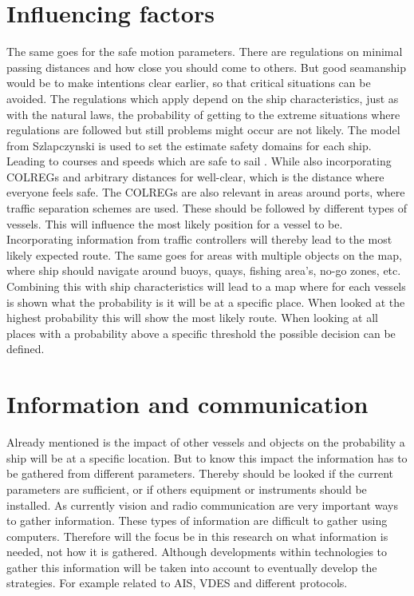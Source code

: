 \section{Influencing factors}
The same goes for the safe motion parameters. There are regulations on minimal passing distances and how close you should come to others. But good seamanship would be to make intentions clear earlier, so that critical situations can be avoided. The regulations which apply depend on the ship characteristics, just as with the natural laws, the probability of getting to the extreme situations where regulations are followed but still problems might occur are not likely.
The model from Szlapczynski is used to set the estimate safety domains for each ship. Leading to courses and speeds which are safe to sail \cite{Szlapczynski2017}. While also incorporating \ac{COLREGs} and arbitrary distances for well-clear, which is the distance where everyone feels safe.
The \ac{COLREGs} are also relevant in areas around ports, where traffic separation schemes are used. These should be followed by different types of vessels. This will influence the most likely position for a vessel to be. Incorporating information from traffic controllers will thereby lead to the most likely expected route. The same goes for areas with multiple objects on the map, where ship should navigate around buoys, quays, fishing area's, no-go zones, etc.
Combining this with ship characteristics will lead to a map where for each vessels is shown what the probability is it will be at a specific place. When looked at the highest probability this will show the most likely route. When looking at all places with a probability above a specific threshold the possible decision can be defined.

\section{Information and communication}
Already mentioned is the impact of other vessels and objects on the probability a ship will be at a specific location. But to know this impact the information has to be gathered from different parameters. Thereby should be looked if the current parameters are sufficient, or if others equipment or instruments should be installed. As currently vision and radio communication are very important ways to gather information. These types of information are difficult to gather using computers. Therefore will the focus be in this research on what information is needed, not how it is gathered. Although developments within technologies to gather this information will be taken into account to eventually develop the strategies. For example related to \ac{AIS}, \ac{VDES} and different protocols.


